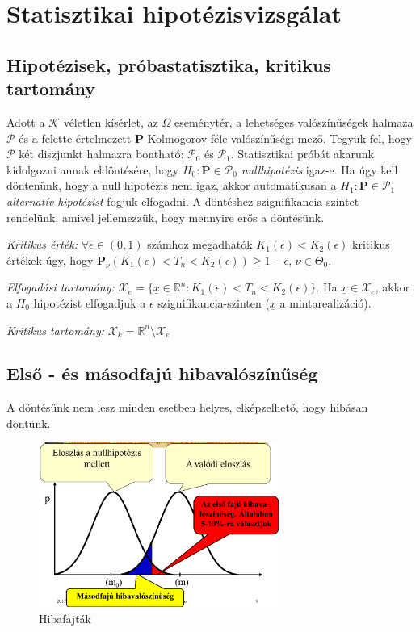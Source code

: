 \chapter{Statisztikai hipotézisvizsgálat}

\section{Hipotézisek, próbastatisztika, kritikus tartomány}

Adott a $\mathcal{K}$ véletlen kísérlet, az $\Omega$ eseménytér,  a lehetséges valószínűségek halmaza $\mathcal{P}$ és a felette értelmezett $\mathbf{P}$ Kolmogorov-féle valószínűségi mező. Tegyük fel, hogy $\mathcal{P}$ két diszjunkt halmazra bontható: $\mathcal{P}_0$ és $\mathcal{P}_1$. Statisztikai próbát akarunk kidolgozni annak eldöntésére, hogy $H_0:\mathbf{P}\in\mathcal{P}_0$ \emph{nullhipotézis} igaz-e. Ha úgy kell döntenünk, hogy a null hipotézis nem igaz, akkor automatikusan a $H_1:\mathbf{P}\in\mathcal{P}_1$ \emph{alternatív hipotézist} fogjuk elfogadni. A döntéshez szignifikancia szintet rendelünk, amivel jellemezzük, hogy mennyire erős a döntésünk.

\emph{Kritikus érték:} $\forall \epsilon \in (0,1)$ számhoz megadhatók $K_1(\epsilon) < K_2(\epsilon)$ kritikus értékek úgy, hogy $\mathbf{P}_\nu(K_1(\epsilon)< T_n < K_2(\epsilon)) \geq 1-\epsilon$, $\nu \in \Theta_0$.

\emph{Elfogadási tartomány:} $\mathcal{X}_e = \{\underline{x} \in \mathbb{R}^n : K_1(\epsilon)< T_n < K_2(\epsilon)\}$. Ha $\underline{x} \in \mathcal{X}_e$, akkor a $H_0$ hipotézist elfogadjuk a $\epsilon$ szignifikancia-szinten ($\underline{x}$ a mintarealizáció).

\emph{Kritikus tartomány:} $\mathcal{X}_k = \mathbb{R}^n \setminus \mathcal{X}_e$


\section{Első - és másodfajú hibavalószínűség}

A döntésünk nem lesz minden esetben helyes, elképzelhető, hogy hibásan döntünk.


\begin{figure}[h]
  \caption{Hibafajták}
  \centering
  \includegraphics[width=0.7\textwidth]{figures/hibafajtak.png}
\end{figure}


